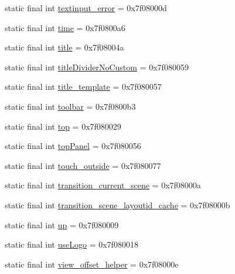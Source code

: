 \begin{CompactItemize}
\item 
static final int \hyperlink{classandroid_1_1support_1_1fragment_1_1_r_1_1id_5ed019c4a8fbca91e418b838e15df9f1}{textinput\_\-error} = 0x7f08000d
\item 
static final int \hyperlink{classandroid_1_1support_1_1fragment_1_1_r_1_1id_dd099862200628cbad9838046178c1a3}{time} = 0x7f0800a6
\item 
static final int \hyperlink{classandroid_1_1support_1_1fragment_1_1_r_1_1id_c9bf718d0da13857a57da10706a4dd79}{title} = 0x7f08004a
\item 
static final int \hyperlink{classandroid_1_1support_1_1fragment_1_1_r_1_1id_ea3ae7b7e9ba98e0b73542cd29ff142e}{titleDividerNoCustom} = 0x7f080059
\item 
static final int \hyperlink{classandroid_1_1support_1_1fragment_1_1_r_1_1id_ef6e933a4a9d5846660fce418d1bf4ea}{title\_\-template} = 0x7f080057
\item 
static final int \hyperlink{classandroid_1_1support_1_1fragment_1_1_r_1_1id_8eaff57be097bd675ff13e355ea80599}{toolbar} = 0x7f0800b3
\item 
static final int \hyperlink{classandroid_1_1support_1_1fragment_1_1_r_1_1id_3252f0b98513774319cef84d5536590c}{top} = 0x7f080029
\item 
static final int \hyperlink{classandroid_1_1support_1_1fragment_1_1_r_1_1id_e734736fb245e52c379b8137e4edf34c}{topPanel} = 0x7f080056
\item 
static final int \hyperlink{classandroid_1_1support_1_1fragment_1_1_r_1_1id_02facacdeefe3db7df2c41f0f3d62ea4}{touch\_\-outside} = 0x7f080077
\item 
static final int \hyperlink{classandroid_1_1support_1_1fragment_1_1_r_1_1id_38e0d4bd279ff6628010a746a44daee3}{transition\_\-current\_\-scene} = 0x7f08000a
\item 
static final int \hyperlink{classandroid_1_1support_1_1fragment_1_1_r_1_1id_65e5205598ebb9311cca6fe1f1192e1b}{transition\_\-scene\_\-layoutid\_\-cache} = 0x7f08000b
\item 
static final int \hyperlink{classandroid_1_1support_1_1fragment_1_1_r_1_1id_787a85042a0973974dbd969b0f3401f8}{up} = 0x7f080009
\item 
static final int \hyperlink{classandroid_1_1support_1_1fragment_1_1_r_1_1id_caf764487d62087688367bd7e192b87d}{useLogo} = 0x7f080018
\item 
static final int \hyperlink{classandroid_1_1support_1_1fragment_1_1_r_1_1id_47be60f0eeb78e78ea29be9f899d1498}{view\_\-offset\_\-helper} = 0x7f08000e

\end{CompactItemize}
